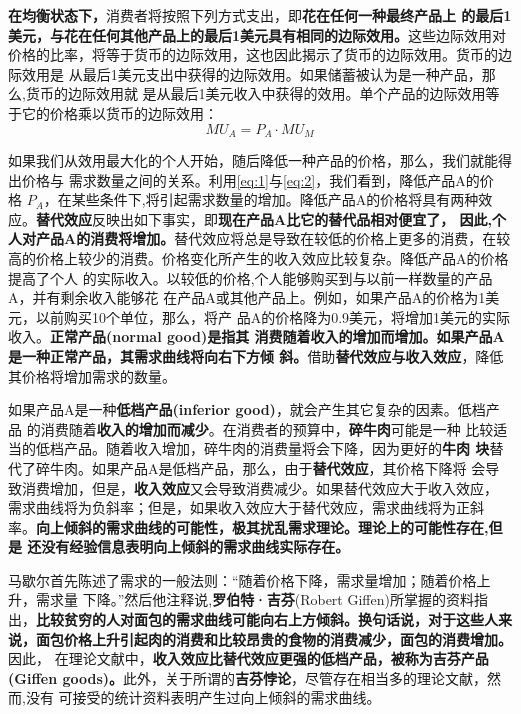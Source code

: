 \textbf{在均衡状态下，}消费者将按照下列方式支出，即\textbf{花在任何一种最终产品上
  的最后1美元，与花在任何其他产品上的最后1美元具有相同的边际效用。}这些边际效用对
价格的比率，将等于货币的边际效用，这也因此揭示了货币的边际效用。货币的边际效用是
从最后1美元支出中获得的边际效用。如果储蓄被认为是一种产品，那么,货币的边际效用就
是从最后1美元收入中获得的效用。单个产品的边际效用等于它的价格乘以货币的边际效用：
\begin{equation}
  \label{eq:2}
  MU_A = P_A \cdot MU_M
\end{equation}

如果我们从效用最大化的个人开始，随后降低一种产品的价格，那么，我们就能得出价格与
需求数量之间的关系。利用\cref{eq:1}与\cref{eq:2}，我们看到，降低产品A的价
格 $P_A$，在某些条件下,将引起需求数量的增加。降低产品A的价格将具有两种效
应。\textbf{替代效应}反映出如下事实，即\textbf{现在产品A比它的替代品相对便宜了，
  因此,个人对产品A的消费将增加。}替代效应将总是导致在较低的价格上更多的消费，在较
高的价格上较少的消费。价格变化所产生的收入效应比较复杂。降低产品A的价格提高了个人
的实际收入。以较低的价格,个人能够购买到与以前一样数量的产品A，并有剩余收入能够花
在产品A或其他产品上。例如，如果产品A的价格为1美元，以前购买10个单位，那么，将产
品A的价格降为0.9美元，将增加1美元的实际收入。\textbf{正常产品(normal good)是指其
  消费随着收入的增加而增加。如果产品A是一种正常产品，其需求曲线将向右下方倾
  斜。}借助\textbf{替代效应与收入效应}，降低其价格将增加需求的数量。

如果产品A是一种\textbf{低档产品(inferior good)}，就会产生其它复杂的因素。低档产品
的消费随着\textbf{收入的增加而减少}。在消费者的预算中，\textbf{碎牛肉}可能是一种
比较适当的低档产品。随着收入增加，碎牛肉的消费量将会下降，因为更好的\textbf{牛肉
  块}替代了碎牛肉。如果产品A是低档产品，那么，由于\textbf{替代效应}，其价格下降将
会导致消费增加，但是，\textbf{收入效应}又会导致消费减少。如果替代效应大于收入效应，
需求曲线将为负斜率；但是，如果收入效应大于替代效应，需求曲线将为正斜
率。\textbf{向上倾斜的需求曲线的可能性，极其扰乱需求理论。理论上的可能性存在,但是
  还没有经验信息表明向上倾斜的需求曲线实际存在。}

马歇尔首先陈述了需求的一般法则：“随着价格下降，需求量增加；随着价格上升，需求量
下降。”然后他注释说,\textbf{罗伯特·吉芬}(Robert Giffen)所掌握的资料指
出，\textbf{比较贫穷的人对面包的需求曲线可能向右上方倾斜。换句话说，对于这些人来
  说，面包价格上升引起肉的消费和比较昂贵的食物的消费减少，面包的消费增加。}因此，
在理论文献中，\textbf{收入效应比替代效应更强的低档产品，被称为吉芬产品(Giffen
  goods)。}此外，关于所谓的\textbf{吉芬悖论}，尽管存在相当多的理论文献，然而,没有
可接受的统计资料表明产生过向上倾斜的需求曲线。

